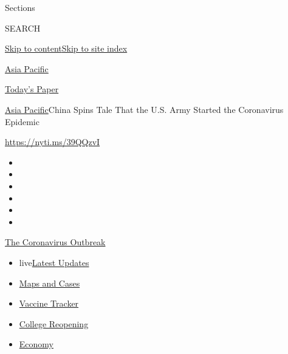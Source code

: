 Sections

SEARCH

\protect\hyperlink{site-content}{Skip to
content}\protect\hyperlink{site-index}{Skip to site index}

\href{https://www.nytimes3xbfgragh.onion/section/world/asia}{Asia
Pacific}

\href{https://myaccount.nytimes3xbfgragh.onion/auth/login?response_type=cookie\&client_id=vi}{}

\href{https://www.nytimes3xbfgragh.onion/section/todayspaper}{Today's
Paper}

\href{/section/world/asia}{Asia Pacific}\textbar{}China Spins Tale That
the U.S. Army Started the Coronavirus Epidemic

\url{https://nyti.ms/39QQzvI}

\begin{itemize}
\item
\item
\item
\item
\item
\item
\end{itemize}

\href{https://www.nytimes3xbfgragh.onion/news-event/coronavirus?action=click\&pgtype=Article\&state=default\&region=TOP_BANNER\&context=storylines_menu}{The
Coronavirus Outbreak}

\begin{itemize}
\tightlist
\item
  live\href{https://www.nytimes3xbfgragh.onion/2020/08/04/world/coronavirus-covid-19.html?action=click\&pgtype=Article\&state=default\&region=TOP_BANNER\&context=storylines_menu}{Latest
  Updates}
\item
  \href{https://www.nytimes3xbfgragh.onion/interactive/2020/us/coronavirus-us-cases.html?action=click\&pgtype=Article\&state=default\&region=TOP_BANNER\&context=storylines_menu}{Maps
  and Cases}
\item
  \href{https://www.nytimes3xbfgragh.onion/interactive/2020/science/coronavirus-vaccine-tracker.html?action=click\&pgtype=Article\&state=default\&region=TOP_BANNER\&context=storylines_menu}{Vaccine
  Tracker}
\item
  \href{https://www.nytimes3xbfgragh.onion/2020/08/02/us/covid-college-reopening.html?action=click\&pgtype=Article\&state=default\&region=TOP_BANNER\&context=storylines_menu}{College
  Reopening}
\item
  \href{https://www.nytimes3xbfgragh.onion/live/2020/08/03/business/stock-market-today-coronavirus?action=click\&pgtype=Article\&state=default\&region=TOP_BANNER\&context=storylines_menu}{Economy}
\end{itemize}

